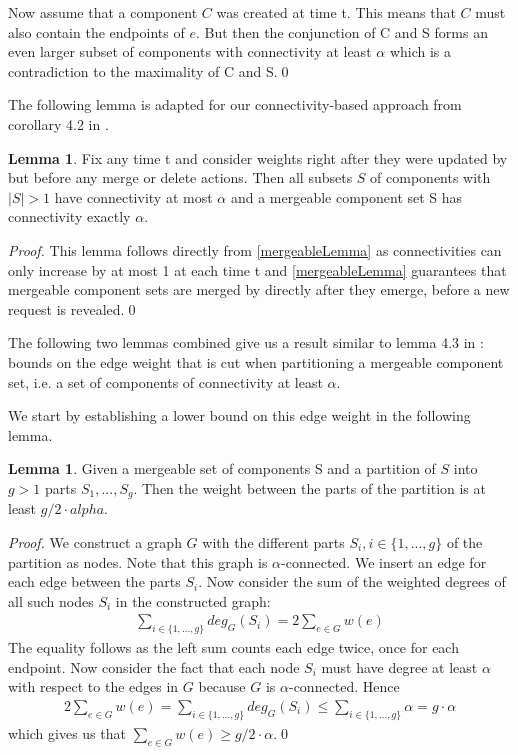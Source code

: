 \documentclass[a4paper,xcolor=dvipsnames, tikz, 12pt]{article}
\newcommand{\nl}{\newline}
\newcommand{\crep}{\text{C{\scriptsize REP}}}
\theoremstyle{definition}
\newtheorem{lemma}[defi]{Lemma}
\begin{document}
Now assume that a component $C$ was created at time t. This means that $C$ must also contain the endpoints of $e$. But then the conjunction of C and S forms an even larger subset of components with connectivity at least $\alpha$ which is a contradiction to the maximality of C and S.\qed\nl

The following lemma is adapted for our connectivity-based approach from corollary 4.2 in \cite{Avin2015}.

\begin{lemma}
	\label{mergeable_lemma}
	Fix any time t and consider weights right after they were updated by \crep{} but before any merge or delete actions. Then all subsets $S$ of components with $|S|>1$ have connectivity at most $\alpha$ and a mergeable component set S has connectivity exactly $\alpha$.
\end{lemma}

\textit{Proof.} This lemma follows directly from \cref{mergeableLemma} as connectivities can only increase by at most 1 at each time t and \cref{mergeableLemma} guarantees that mergeable component sets are merged by \crep{} directly after they emerge, before a new request is revealed.\qed\nl

The following two lemmas combined give us a result similar to lemma 4.3 in \cite{Avin2015}: bounds on the edge weight that is cut when partitioning a mergeable component set, i.e. a set of components of connectivity at least $\alpha$.

We start by establishing a lower bound on this edge weight in the following lemma.

\begin{lemma}
	\label{cut_lemma}
	Given a mergeable set of components S and a partition of $S$ into $g>1$ parts $S_1,...,S_g$. Then the weight between the parts of the partition is at least $g/2 \cdot alpha$.
\end{lemma}
\textit{Proof.} We construct a graph $G$ with the different parts $S_i, i\in\{1,...,g\}$ of the partition as nodes. Note that this graph is $\alpha$-connected. We insert an edge for each edge between the parts $S_i$. Now consider the sum of the weighted degrees of all such nodes $S_i$ in the constructed graph:
\begin{align*}
\sum_{i\in\{1,...,g\}}deg_G(S_i)=2\sum_{e\in G}w(e)
\end{align*}
The equality follows as the left sum counts each edge twice, once for each endpoint.
Now consider the fact that each node $S_i$ must have degree at least $\alpha$ with respect to the edges in $G$ because $G$ is $\alpha$-connected. Hence
\begin{align*}
2\sum_{e\in G}w(e)=\sum_{i\in\{1,...,g\}}deg_G(S_i)\leq\sum_{i\in\{1,...,g\}}\alpha=g\cdot\alpha
\end{align*}
which gives us that $\sum_{e\in G}w(e)\geq g/2\cdot\alpha$.\qed\nl
\end{document}
